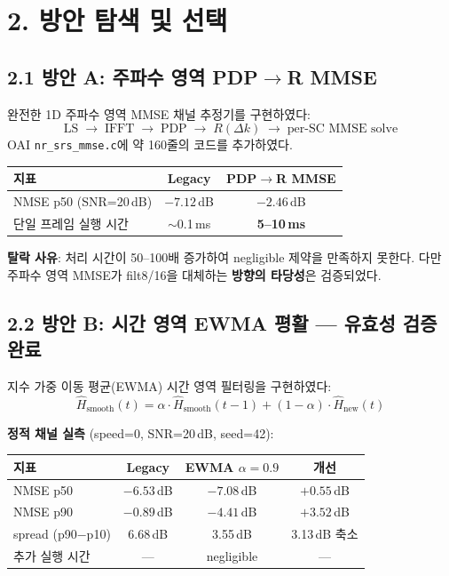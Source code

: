 \documentclass[11pt,a4paper]{article}
\begin{document}
\section{2. 방안 탐색 및 선택}

\subsection{2.1 방안 A: 주파수 영역 PDP$\to$R MMSE}

완전한 1D 주파수 영역 MMSE 채널 추정기를 구현하였다:
\[
\text{LS} \;\to\; \text{IFFT} \;\to\; \text{PDP} \;\to\; R(\Delta k) \;\to\; \text{per-SC MMSE solve}
\]
OAI \texttt{nr\_srs\_mmse.c}에 약 160줄의 코드를 추가하였다.

\begin{table}[h]\centering
\begin{tabular}{lcc}
\toprule
지표 & Legacy & PDP$\to$R MMSE \\
\midrule
NMSE p50 (SNR=20\,dB) & $-7.12$\,dB & $-2.46$\,dB \\
단일 프레임 실행 시간 & $\sim$0.1\,ms & \textbf{5--10\,ms} \\
\bottomrule
\end{tabular}
\end{table}

\textbf{탈락 사유}: 처리 시간이 50--100배 증가하여 negligible 제약을 만족하지 못한다. 다만 주파수 영역 MMSE가 filt8/16을 대체하는 \textbf{방향의 타당성}은 검증되었다.

\subsection{2.2 방안 B: 시간 영역 EWMA 평활 — 유효성 검증 완료}

지수 가중 이동 평균(EWMA) 시간 영역 필터링을 구현하였다:
\[
\hat{H}_{\text{smooth}}(t) = \alpha \cdot \hat{H}_{\text{smooth}}(t\!-\!1) + (1\!-\!\alpha) \cdot \hat{H}_{\text{new}}(t)
\]

\textbf{정적 채널 실측} (speed=0, SNR=20\,dB, seed=42):

\begin{table}[h]\centering
\begin{tabular}{lccc}
\toprule
지표 & Legacy & EWMA $\alpha=0.9$ & 개선 \\
\midrule
NMSE p50 & $-6.53$\,dB & $\mathbf{-7.08}$\,dB & $+0.55$\,dB \\
NMSE p90 & $-0.89$\,dB & $\mathbf{-4.41}$\,dB & $+3.52$\,dB \\
spread (p90$-$p10) & 6.68\,dB & 3.55\,dB & 3.13\,dB 축소 \\
추가 실행 시간 & --- & negligible & --- \\
\bottomrule
\end{tabular}
\end{table}
\end{document}
